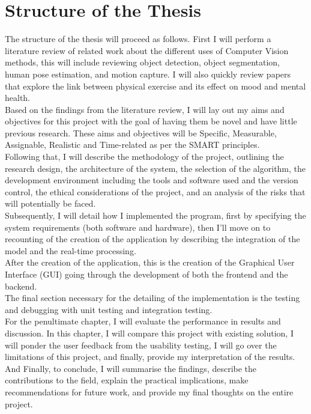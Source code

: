\section{Structure of the Thesis}
    The structure of the thesis will proceed as follows. First I will perform a literature review of related work about the different uses of Computer Vision methods, this will include reviewing object detection, object segmentation, human pose estimation, and motion capture. I will also quickly review papers that explore the link between physical exercise and its effect on mood and mental health.\\
    Based on the findings from the literature review, I will lay out my aims and objectives for this project with the goal of having them be novel and have little previous research. These aims and objectives will be Specific, Measurable, Assignable, Realistic and Time-related as per the SMART principles.\\
    Following that, I will describe the methodology of the project, outlining the research design, the architecture of the system, the selection of the algorithm, the development environment including the tools and software used and the version control, the ethical considerations of the project, and an analysis of the risks that will potentially be faced.\\
    Subsequently, I will detail how I implemented the program, first by specifying the system requirements (both software and hardware), then I'll move on to recounting of the creation of the application by describing the integration of the model and the real-time processing.\\
    After the creation of the application, this is the creation of the Graphical User Interface (GUI) going through the development of both the frontend and the backend.\\
    The final section necessary for the detailing of the implementation is the testing and debugging with unit testing and integration testing.\\
    For the penultimate chapter, I will evaluate the performance in results and discussion. In this chapter, I will compare this project with existing solution, I will ponder the user feedback from the usability testing, I will go over the limitations of this project, and finally, provide my interpretation of the results.\\
    And Finally, to conclude, I will summarise the findings, describe the contributions to the field, explain the practical implications, make recommendations for future work, and provide my final thoughts on the entire project.